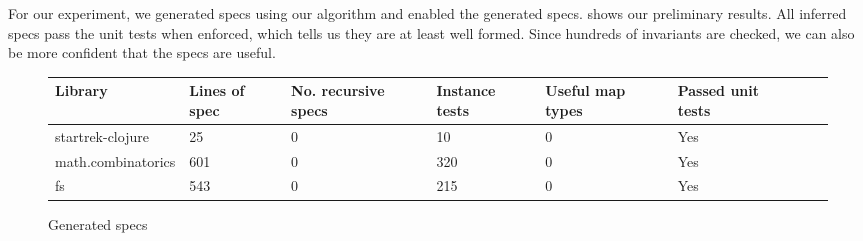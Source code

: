 
For our experiment, we generated specs using our algorithm and enabled
the generated specs.  shows
our preliminary results. All inferred specs pass the unit
tests when enforced, which tells us they are at least well formed.
Since hundreds of invariants are checked, we can also be more confident
that the specs are useful.


\begin{figure*}
\begin{tabular}{| l | l | l | l | l | l | l | l |}
  Library            & Lines of spec & No. recursive specs & Instance tests & Useful map types & Passed unit tests \\
  \hline
  startrek-clojure   & 25            & 0                   & 10             & 0                & Yes\\
  math.combinatorics & 601           & 0                   & 320            & 0                & Yes\\
  fs                 & 543           & 0                   & 215            & 0                & Yes \\
\end{tabular}
\caption{Generated specs}
  \label{infer:fig:genspec}
\end{figure*}




% 
% 
%
% 
